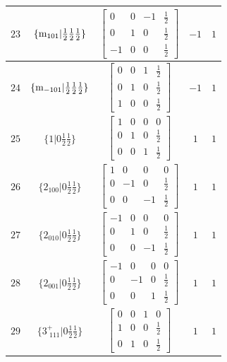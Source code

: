 \documentclass[fleqn,8pt]{jsarticle}
\begin{document}
\begin{longtable}{ccccc}
$ 23 $ & $ \{{\rm m}_{101}|\frac{1}{2} \frac{1}{2} \frac{1}{2}\} $ & $ \begin{bmatrix} 0 & 0 & -1 & \frac{1}{2} \\ 0 & 1 & 0 & \frac{1}{2} \\ -1 & 0 & 0 & \frac{1}{2} \end{bmatrix} $ & $ -1 $ & $ 1 $ \\ \hline
$ 24 $ & $ \{{\rm m}_{-101}|\frac{1}{2} \frac{1}{2} \frac{1}{2}\} $ & $ \begin{bmatrix} 0 & 0 & 1 & \frac{1}{2} \\ 0 & 1 & 0 & \frac{1}{2} \\ 1 & 0 & 0 & \frac{1}{2} \end{bmatrix} $ & $ -1 $ & $ 1 $ \\ \hline
$ 25 $ & $ \{1|0 \frac{1}{2} \frac{1}{2}\} $ & $ \begin{bmatrix} 1 & 0 & 0 & 0 \\ 0 & 1 & 0 & \frac{1}{2} \\ 0 & 0 & 1 & \frac{1}{2} \end{bmatrix} $ & $ 1 $ & $ 1 $ \\ \hline
$ 26 $ & $ \{2{}_{100}|0 \frac{1}{2} \frac{1}{2}\} $ & $ \begin{bmatrix} 1 & 0 & 0 & 0 \\ 0 & -1 & 0 & \frac{1}{2} \\ 0 & 0 & -1 & \frac{1}{2} \end{bmatrix} $ & $ 1 $ & $ 1 $ \\ \hline
$ 27 $ & $ \{2{}_{010}|0 \frac{1}{2} \frac{1}{2}\} $ & $ \begin{bmatrix} -1 & 0 & 0 & 0 \\ 0 & 1 & 0 & \frac{1}{2} \\ 0 & 0 & -1 & \frac{1}{2} \end{bmatrix} $ & $ 1 $ & $ 1 $ \\ \hline
$ 28 $ & $ \{2{}_{001}|0 \frac{1}{2} \frac{1}{2}\} $ & $ \begin{bmatrix} -1 & 0 & 0 & 0 \\ 0 & -1 & 0 & \frac{1}{2} \\ 0 & 0 & 1 & \frac{1}{2} \end{bmatrix} $ & $ 1 $ & $ 1 $ \\ \hline
$ 29 $ & $ \{3^{+}_{\,\,111}|0 \frac{1}{2} \frac{1}{2}\} $ & $ \begin{bmatrix} 0 & 0 & 1 & 0 \\ 1 & 0 & 0 & \frac{1}{2} \\ 0 & 1 & 0 & \frac{1}{2} \end{bmatrix} $ & $ 1 $ & $ 1 $ \\ \hline

\end{longtable}
\end{document}
